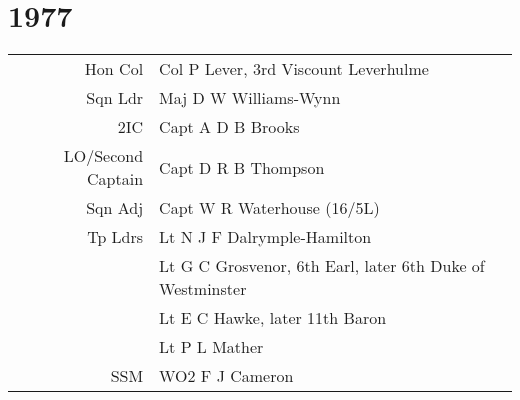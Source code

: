 \chapter*{1977}

\begin{center}
  \small
  \begin{tabular}{rl}
    Hon Col & Col P Lever, 3rd Viscount Leverhulme \\
    Sqn Ldr & Maj D W Williams-Wynn \\
    2IC & Capt A D B Brooks \\
    LO/Second Captain & Capt D R B Thompson \\
    Sqn Adj & Capt W R Waterhouse (16/5L) \\
    Tp Ldrs & Lt N J F Dalrymple-Hamilton \\
      & Lt G C Grosvenor, 6th Earl, later 6th Duke of Westminster \\
      & Lt E C Hawke, later 11th Baron \\
      & Lt P L Mather \\
    SSM & WO2 F J Cameron \\
  \end{tabular}
\end{center}

